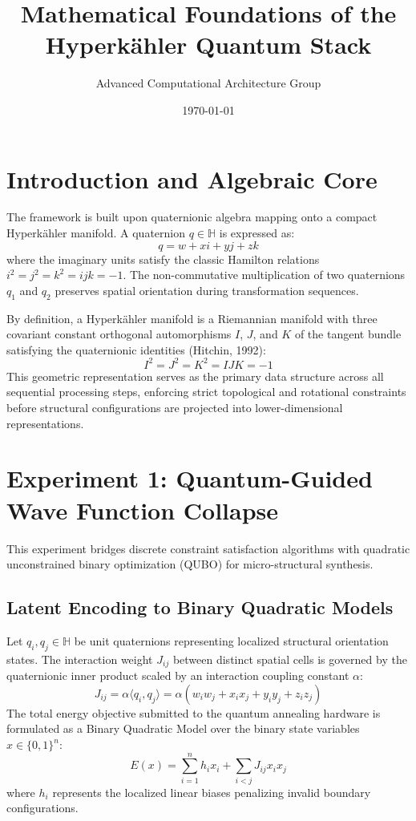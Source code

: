 \documentclass[11pt,a4paper]{article}
\title{Mathematical Foundations of the Hyperk\"ahler Quantum Stack}
\author{Advanced Computational Architecture Group}
\date{\today}
\begin{document}
\maketitle

\section{Introduction and Algebraic Core}
The framework is built upon quaternionic algebra mapping onto a compact Hyperk\"ahler manifold. A quaternion $q \in \mathbb{H}$ is expressed as:
\begin{equation}
q = w + xi + yj + zk
\end{equation}
where the imaginary units satisfy the classic Hamilton relations $i^2 = j^2 = k^2 = ijk = -1$. The non-commutative multiplication of two quaternions $q_1$ and $q_2$ preserves spatial orientation during transformation sequences. 

By definition, a Hyperk\"ahler manifold is a Riemannian manifold with three covariant constant orthogonal automorphisms $I$, $J$, and $K$ of the tangent bundle satisfying the quaternionic identities (Hitchin, 1992):
\begin{equation}
I^2 = J^2 = K^2 = IJK = -1
\end{equation}
This geometric representation serves as the primary data structure across all sequential processing steps, enforcing strict topological and rotational constraints before structural configurations are projected into lower-dimensional representations.

\section{Experiment 1: Quantum-Guided Wave Function Collapse}
This experiment bridges discrete constraint satisfaction algorithms with quadratic unconstrained binary optimization (QUBO) for micro-structural synthesis.

\subsection{Latent Encoding to Binary Quadratic Models}
Let $q_i, q_j \in \mathbb{H}$ be unit quaternions representing localized structural orientation states. The interaction weight $J_{ij}$ between distinct spatial cells is governed by the quaternionic inner product scaled by an interaction coupling constant $\alpha$:
\begin{equation}
J_{ij} = \alpha \langle q_i, q_j \rangle = \alpha (w_i w_j + x_i x_j + y_i y_j + z_i z_j)
\end{equation}
The total energy objective submitted to the quantum annealing hardware is formulated as a Binary Quadratic Model over the binary state variables $x \in \{0, 1\}^n$:
\begin{equation}
E(x) = \sum_{i=1}^n h_i x_i + \sum_{i < j} J_{ij} x_i x_j
\end{equation}
where $h_i$ represents the localized linear biases penalizing invalid boundary configurations.
\end{document}
